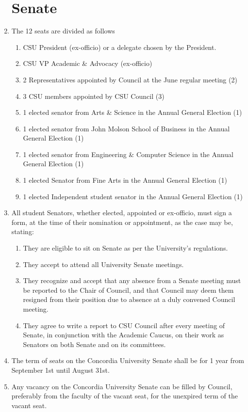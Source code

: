 \documentclass[oneside]{book}
\begin{document}
\begin{enumerate}
\chapter{\label{Senate}Senate }
\item The 12 seats are divided as follows 

\begin{enumerate}
\item CSU President (ex-officio) or a delegate chosen by the President. 
\item CSU VP Academic \& Advocacy (ex-officio) 
\item 2 Representatives appointed by Council at the June regular meeting
(2) 
\item 3 CSU members appointed by CSU Council (3) 
\item 1 elected senator from Arts \& Science in the Annual General Election
(1) 
\item 1 elected senator from John Molson School of Business in the Annual
General Election (1) 
\item 1 elected senator from Engineering \& Computer Science in the Annual
General Election (1) 
\item 1 elected Senator from Fine Arts in the Annual General Election (1) 
\item 1 elected Independent student senator in the Annual General Election
(1) 
\end{enumerate}
\item \label{enu:senate-required-form}All student Senators, whether elected,
appointed or ex-officio, must sign a form, at the time of their nomination
or appointment, as the case may be, stating: 

\begin{enumerate}
\item They are eligible to sit on Senate as per the University's regulations. 
\item They accept to attend all University Senate meetings. 
\item They recognize and accept that any absence from a Senate meeting must
be reported to the Chair of Council, and that Council may deem them
resigned from their position due to absence at a duly convened Council
meeting. 
\item They agree to write a report to CSU Council after every meeting of
Senate, in conjunction with the Academic Caucus, on their work as
Senators on both Senate and on its committees. 
\end{enumerate}
\item The term of seats on the Concordia University Senate shall be for
1 year from September 1st until August 31st. 
\item Any vacancy on the Concordia University Senate can be filled by Council,
preferably from the faculty of the vacant seat, for the unexpired
term of the vacant seat. 


\end{enumerate}
\end{document}
